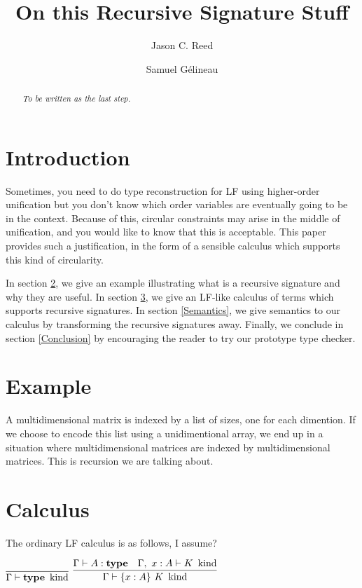 \documentclass{article}
\title{On this Recursive Signature Stuff}
\author{Jason C. Reed \and Samuel G\'elineau}
\begin{document}
\maketitle

\begin{abstract}\em
To be written as the last step.
\end{abstract}

\section{Introduction}\label{Introduction}
Sometimes, you need to do type reconstruction for LF using higher-order unification but you don't know which order variables are eventually going to be in the context. Because of this, circular constraints may arise in the middle of unification, and you would like to know that this is acceptable. This paper provides such a justification, in the form of a sensible calculus which supports this kind of circularity.

In section \ref{Example}, we give an example illustrating what is a recursive signature and why they are useful. In section \ref{Calculus}, we give an LF-like calculus of terms which supports recursive signatures. In section \ref{Semantics}, we give semantics to our calculus by transforming the recursive signatures away. Finally, we conclude in section \ref{Conclusion} by encouraging the reader to try our prototype type checker.

\section{Example}\label{Example}
A multidimensional matrix is indexed by a list of sizes, one for each dimention. If we choose to encode this list using a unidimentional array, we end up in a situation where multidimensional matrices are indexed by multidimensional matrices. This is recursion we are talking about.

\section{Calculus}\label{Calculus}
The ordinary LF calculus is as follows, I assume?

\newcommand{\entails}{\vdash}
\newcommand{\kind}{~\mathop{\mathrm{kind}}}
\newcommand{\type}{\mathop{\mathbf{type}}}
\hspace*{\fill}
$\infer{\Gamma \entails \type \kind}{}$
\hspace*{\fill}
$\infer{\Gamma \entails \{x:A\}~K \kind}{\Gamma \entails A : \type & \Gamma,~x:A \entails K \kind}$
\hspace*{\fill}
\end{document}
